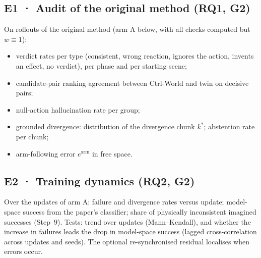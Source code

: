\subsection{E1 · Audit of the original method (RQ1, G2)}
On rollouts of the original method (arm A below, with all checks computed but $w\equiv1$):
\begin{itemize}
\item verdict rates per type (consistent, wrong reaction, ignores the action, invents an effect, no verdict), per phase and per starting scene;
\item candidate-pair ranking agreement between Ctrl-World and twin on decisive pairs;
\item null-action hallucination rate per group;
\item grounded divergence: distribution of the divergence chunk $k^\ast$; abstention rate per chunk;
\item arm-following error $e^{\mathrm{arm}}$ in free space.
\end{itemize}

\subsection{E2 · Training dynamics (RQ2, G2)}
Over the updates of arm A: failure and divergence rates versus update; model-space success from the paper's classifier; share of physically inconsistent imagined successes (Step~9). Tests: trend over updates (Mann--Kendall), and whether the increase in failures leads the drop in model-space success (lagged cross-correlation across updates and seeds). The optional re-synchronised residual localises when errors occur.


